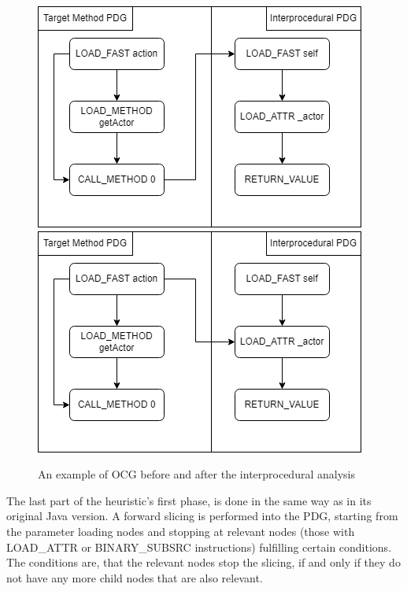 \documentclass[%
  chapterprefix=false,%
  open=right,%
  twoside=true,%
  paper=a4,%
  logofile={Figures/logo.png},%
  thesistype=master,%
  UKenglish,%
]{se2thesis}
\begin{document}
\begin{figure}[htb]
    \includegraphics[width=\linewidth]{Figures/before_analysis.png}
  \endminipage\hfill
    \includegraphics[width=\linewidth]{Figures/after_analysis.png}
  \endminipage\hfill
\caption{An example of OCG before and after the interprocedural analysis}\label{fig:inter_analysis}
\end{figure}

The last part of the heuristic's first phase, is done in the same way as in its original Java version.
A forward slicing is performed into the PDG, starting from the parameter loading nodes and stopping at relevant nodes (those with LOAD\_ATTR or BINARY\_SUBSRC instructions) fulfilling certain conditions.
The conditions are, that the relevant nodes stop the slicing, if and only if they do not have any more child nodes that are also relevant.
\end{document}
